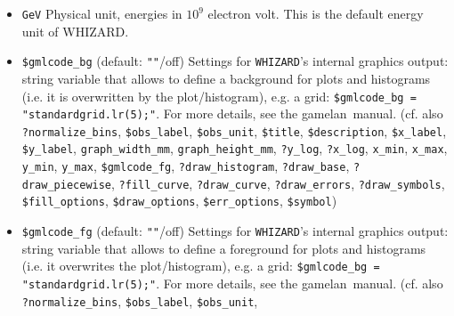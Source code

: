 \documentclass[12pt]{book}
\newcommand{\ttt}[1]{\texttt{#1}}
\newcommand{\whizard}{\texttt{WHIZARD}}
\newcommand{\gamelan}{\textsf{gamelan}}
\begin{document}
\begin{itemize}
Settings for \whizard's internal graphics output: 
\ttt{\$fill\_options = "<LaTeX\_code>"} is a string variable that
allows to set fill options 
when plotting data as filled curves with the $\to$ \ttt{?fill\_curve}
flag. For more details see the \gamelan\ manual. (cf. also 
\ttt{?normalize\_bins}, \ttt{\$obs\_label}, \ttt{\$obs\_unit}, 
\ttt{\$title}, \ttt{\$description}, \ttt{\$x\_label},
\ttt{\$y\_label}, \ttt{graph\_width\_mm}, \ttt{graph\_height\_mm},
\ttt{?y\_log}, \ttt{?x\_log}, \ttt{x\_min}, \ttt{x\_max}, 
\ttt{y\_min}, \ttt{y\_max}, \ttt{\$gmlcode\_fg}, \ttt{\$gmlcode\_bg},
\ttt{?draw\_base}, \ttt{?draw\_piecewise},
\ttt{?draw\_curve}, \ttt{?draw\_histogram}, \ttt{?draw\_errors},
\newline \ttt{?draw\_symbols}, \ttt{?fill\_curve}, \ttt{\$draw\_options},
\ttt{\$err\_options}, \ttt{\$symbol})
\item
\ttt{GeV} \newline 
Physical unit, energies in $10^9$ electron volt. This is the default
energy unit of WHIZARD.
\item
\ttt{\$gmlcode\_bg} \qquad (default: \ttt{""}/off) \newline
Settings for \whizard's internal graphics output: string variable that
allows to define a background for plots and histograms (i.e. it is
overwritten by the plot/histogram), e.g. a grid: 
\ttt{\$gmlcode\_bg = "standardgrid.lr(5);"}. For more details, see the
\gamelan\ manual. (cf. also
\ttt{?normalize\_bins}, \ttt{\$obs\_label}, \ttt{\$obs\_unit},
\ttt{\$title}, \ttt{\$description}, \ttt{\$x\_label},
\ttt{\$y\_label}, \ttt{graph\_width\_mm}, \ttt{graph\_height\_mm}, 
\ttt{?y\_log}, \ttt{?x\_log}, \ttt{x\_min}, \ttt{x\_max},
\ttt{y\_min}, \ttt{y\_max}, \ttt{\$gmlcode\_fg},
\ttt{?draw\_histogram}, \ttt{?draw\_base}, \ttt{?draw\_piecewise},
\newline \ttt{?fill\_curve}, \ttt{?draw\_curve}, \ttt{?draw\_errors},
\ttt{?draw\_symbols}, \ttt{\$fill\_options}, \newline \ttt{\$draw\_options},
\ttt{\$err\_options}, \ttt{\$symbol})
\item
\ttt{\$gmlcode\_fg} \qquad (default: \ttt{""}/off) \newline
Settings for \whizard's internal graphics output: string variable that
allows to define a foreground for plots and histograms (i.e. it 
overwrites the plot/histogram), e.g. a grid: 
\ttt{\$gmlcode\_bg = "standardgrid.lr(5);"}. For more details, see the
\gamelan\ manual. (cf. also
\ttt{?normalize\_bins}, \ttt{\$obs\_label}, \ttt{\$obs\_unit},

\end{itemize}
\end{document}
